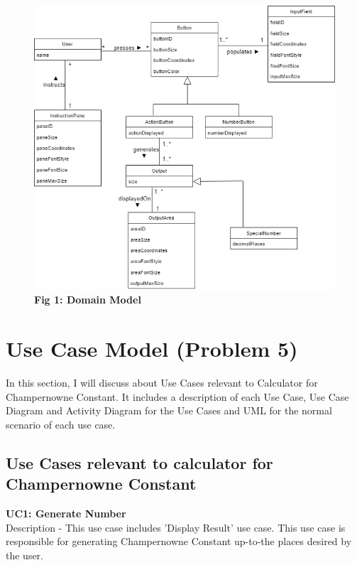 \documentclass[paper=a4, fontsize=11pt]{report}
\numberwithin{equation}{section}		%
\numberwithin{figure}{section}			%
\numberwithin{table}{section}				%
\begin{document}
\pagebreak
\begin{figure}[htp]
    \centering
    \vspace{2cm}
    \includegraphics[width=15cm]{DomainModel.png}
    \caption*{\textbf{Fig 1: Domain Model}}
\end{figure}
\pagebreak


\chapter{Use Case Model (Problem 5)}
In this section, I will discuss about Use Cases relevant to Calculator for Champernowne Constant. \newline
It includes a description of each Use Case, \gls{Use Case Diagram} and \gls{Activity Diagram} for the Use Cases and UML for the normal scenario of each use case.
  
\section{Use Cases relevant to calculator for Champernowne Constant  }

\begin{flushleft}
\textbf{UC1: Generate Number }
\\Description - This use case includes 'Display Result' use case. This use case is responsible for generating Champernowne Constant up-to-the places desired by the user.
\end{flushleft}
\end{document}
